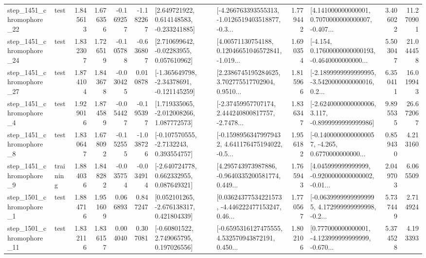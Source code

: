 \begin{tabular}{llrrrrllrlrr}
 step\_1451\_chromophore\_22 &      test &      1.845613 &    1.676356 &     -0.169257 & -1.182267 &    [2.649721922, 0.614148583, -0.233241885] &  [-4.266763393555313, -1.0126519403518877, -0.3... &       1.779442 &  [4.141000000000001, 0.7070000000000007, -0.407... &            3.406022 &         11.270901 \\
 step\_1451\_chromophore\_24 &      test &      1.832307 &    1.726519 &     -0.105788 & -0.636807 &     [2.710699642, -0.02283955, 0.057610962] &  [4.00571130754188, 0.12046651046572841, -1.019... &       1.690354 &  [-4.154, 0.17600000000000193, -0.4640000000000... &            5.503047 &         21.044458 \\
 step\_1451\_chromophore\_27 &      test &      1.874104 &    1.843678 &     -0.030425 &  0.010878 &   [-1.365649798, -2.34378691, -0.121145259] &  [2.2386745195284625, 3.702775517702904, 0.9510... &       1.815966 &  [-2.1899999999999995, -3.5420000000000016, 0.2... &            6.350411 &         16.019943 \\
  step\_1451\_chromophore\_4 &      test &      1.929016 &    1.874589 &     -0.054427 & -0.195397 &    [1.719335065, -2.012008266, 1.087772573] &  [-2.37459957707174, 2.444240800817757, -2.7478... &       1.836347 &  [-2.6240000000000006, 3.117, -0.8999999999999986] &            9.895535 &         26.672067 \\
  step\_1451\_chromophore\_8 &      test &      1.830647 &    1.678092 &     -0.152555 & -1.038726 &     [-0.107570555, -2.7132243, 0.393554757] &  [-0.15989563479979432, 4.641176475194022, -0.5... &       1.956182 &  [-0.14000000000000057, -4.265, 0.6770000000000... &            0.859430 &          4.213160 \\
  step\_1451\_chromophore\_9 &  training &      1.884036 &    1.848282 &     -0.035754 & -0.034914 &    [-2.640724778, 0.662332955, 0.087649321] &  [4.295743973987886, -0.9640335200581774, 0.449... &       1.765943 &  [4.045999999999999, -0.9200000000000002, -0.01... &            2.049703 &          6.065509 \\
  step\_1501\_chromophore\_1 &      test &      1.884716 &    1.951609 &      0.066893 &  0.847247 &    [0.052101265, -2.676138317, 0.421804339] &  [0.03624377534221573, -4.446222477153247, 0.46... &       1.770567 &  [-0.06399999999999995, 4.172999999999998, -0.2... &            5.737449 &          2.714924 \\
 step\_1501\_chromophore\_11 &      test &      1.832116 &    1.836157 &      0.004040 &  0.307081 &     [-0.60801522, 2.749065795, 0.197026556] &  [-0.6595316127475555, 4.532570943872191, 0.450... &       1.802106 &  [0.777000000000001, -4.123999999999999, -0.670... &            5.374528 &          4.193393 \\

\end{tabular}
